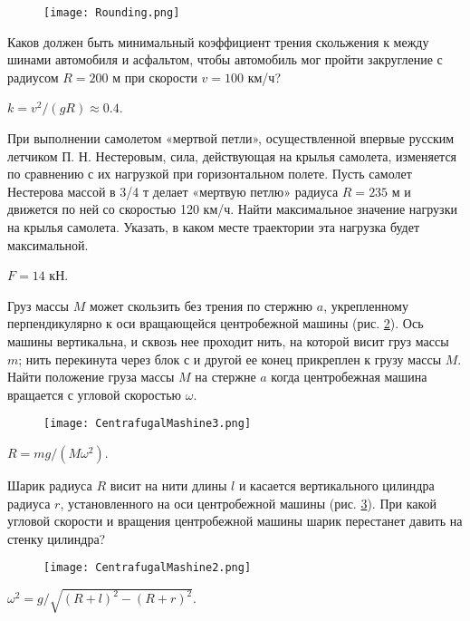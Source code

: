 \begin{figure}[h]
\centering
\texttt{[image: Rounding.png]}
\caption{}
\label{Rounding}
\end{figure}

\begin{ex}  %
Каков должен быть минимальный коэффициент трения скольжения к между шинами автомобиля и асфальтом, чтобы автомобиль мог пройти закругление с радиусом $R = 200$ м при скорости $v = 100$ км/ч?
\begin{ans}
$k=v^2/(gR) \approx 0.4$.
\end{ans}
\end{ex}	

\begin{ex} %
При выполнении самолетом «мертвой петли», осуществленной впервые русским летчиком П. Н. Нестеровым, сила, действующая на крылья самолета, изменяется по сравнению с их нагрузкой при горизонтальном полете. Пусть самолет Нестерова массой в 3/4 т делает «мертвую петлю» радиуса $R = 235$ м и движется по ней со скоростью 120 км/ч. Найти максимальное значение нагрузки на крылья самолета. Указать, в каком месте траектории эта нагрузка будет максимальной.
\begin{ans}
$F = 14$ кН.
\end{ans}
\end{ex}	

\begin{ex} %
Груз массы $M$ может скользить без трения по стержню $a$, укрепленному перпендикулярно к оси вращающейся центробежной машины (рис. \ref{CentrafugalMashine3}). Ось машины вертикальна, и сквозь нее проходит нить, на которой висит груз массы $m$; нить перекинута через блок с и другой ее конец прикреплен к грузу массы $M$. Найти положение груза массы $M$ на стержне $a$ когда центробежная машина вращается с угловой скоростью $\omega$.

\begin{figure}[h]
\centering
\texttt{[image: CentrafugalMashine3.png]}
\caption{}
\label{CentrafugalMashine3}
\end{figure}

\begin{ans}
$R = mg/(M\omega^2)$.
\end{ans}
\end{ex}	

\complexProblems

\begin{ex}  %
Шарик радиуса $R$ висит на нити длины $l$ и касается вертикального цилиндра радиуса $r$, установленного на оси центробежной машины (рис. \ref{CentrafugalMashine2}). При какой угловой скорости и вращения центробежной машины шарик перестанет давить на стенку цилиндра?

\begin{figure}[h]
\centering
\texttt{[image: CentrafugalMashine2.png]}
\caption{}
\label{CentrafugalMashine2}
\end{figure}

\begin{ans}
$\omega^2 = g/\sqrt{(R+l)^2-(R+r)^2}$.
\end{ans}
\end{ex}	

